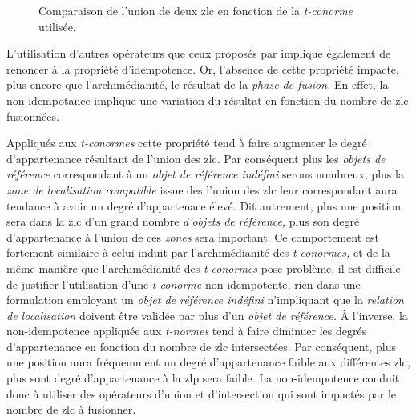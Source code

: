 \begin{figure}
  \centering
  
  \caption{Comparaison de l'union de deux \ac{zlc} en fonction de la
    \emph{t-conorme} utilisée.}
  \label{fig:comparaison_operateurs_union}
\end{figure}

L'utilisation d'autres opérateurs que ceux proposés par
\textcite{Zadeh1965} implique également de renoncer à la propriété
d'idempotence. Or, l'absence de cette propriété impacte, plus encore
que l'archimédianité, le résultat de la \emph{phase de fusion.} En
effet, la non-idempotance implique une variation du résultat en
fonction du nombre de \ac{zlc} fusionnées.

Appliqués aux \emph{t-conormes} cette propriété tend à faire augmenter
le degré d’appartenance résultant de l'union des \ac{zlc}. Par
conséquent plus les \emph{objets de référence} correspondant à un
\emph{objet de référence indéfini} serons nombreux, plus la \emph{zone
  de localisation compatible} issue des l'union des \ac{zlc} leur
correspondant aura tendance à avoir un degré d'appartenace élevé. Dit
autrement, plus une position sera dans la \ac{zlc} d'un grand nombre
\emph{d'objets de référence,} plus son degré d'appartenance à l'union
de ces \emph{zones} sera important. Ce comportement est fortement
similaire à celui induit par l'archimédianité des \emph{t-conormes,}
et de la même manière que l'archimédianité des \emph{t-conormes} pose
problème, il est difficile de justifier l'utilisation d'une
\emph{t-conorme} non-idempotente, rien dans une formulation employant
un \emph{objet de référence indéfini} n'impliquant que la
\emph{relation de localisation} doivent être validée par plus d'un
\emph{objet de référence.} À l'inverse, la non-idempotence appliquée
aux \emph{t-normes} tend à faire diminuer les degrés d'appartenance en
fonction du nombre de \ac{zlc} intersectées. Par conséquent, plus une
position aura fréquemment un degré d'appartenance faible aux
différentes \ac{zlc}, plus sont degré d'appartenance à la \ac{zlp}
sera faible. La non-idempotence conduit donc à utiliser des opérateurs
d'union et d'intersection qui sont impactés par le nombre de \ac{zlc}
à fusionner.

